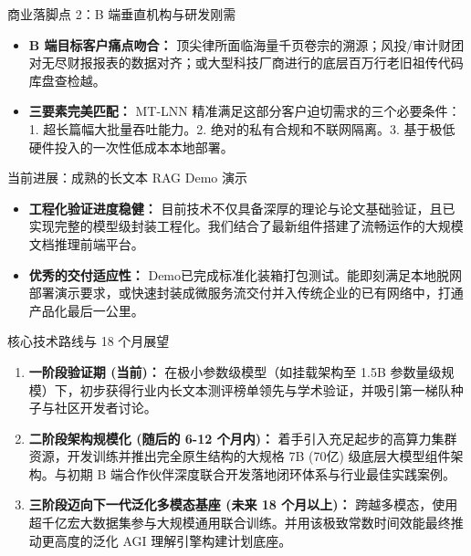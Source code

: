 ﻿\documentclass[aspectratio=169, 10pt]{beamer}
\begin{document}
\begin{frame}{商业落脚点 2：B 端垂直机构与研发刚需}
\begin{itemize}
    \item \textbf{B 端目标客户痛点吻合：} 
        顶尖律所面临海量千页卷宗的溯源；风投/审计财团对无尽财报报表的数据对齐；或大型科技厂商进行的底层百万行老旧祖传代码库盘查检越。
    \item \textbf{三要素完美匹配：} MT-LNN 精准满足这部分客户迫切需求的三个必要条件：1. 超长篇幅大批量吞吐能力。2. 绝对的私有合规和不联网隔离。3. 基于极低硬件投入的一次性低成本本地部署。
\end{itemize}
\end{frame}

\begin{frame}{当前进展：成熟的长文本 RAG Demo 演示}
\begin{itemize}
    \item \textbf{工程化验证进度稳健：} 目前技术不仅具备深厚的理论与论文基础验证，且已实现完整的模型级封装工程化。我们结合了最新组件搭建了流畅运作的大规模文档推理前端平台。
    \item \textbf{优秀的交付适应性：} Demo已完成标准化装箱打包测试。能即刻满足本地脱网部署演示要求，或快速封装成微服务流交付并入传统企业的已有网络中，打通产品化最后一公里。
\end{itemize}
\end{frame}

\begin{frame}{核心技术路线与 18 个月展望}
\begin{enumerate}
    \item \textbf{一阶段验证期 (当前)：} 在极小参数级模型（如挂载架构至 1.5B 参数量级规模）下，初步获得行业内长文本测评榜单领先与学术验证，并吸引第一梯队种子与社区开发者讨论。
    \vspace{0.5em}
    \item \textbf{二阶段架构规模化 (随后的 6-12 个月内)：} 着手引入充足起步的高算力集群资源，开发训练并推出完全原生结构的大规格 7B (70亿) 级底层大模型组件架构。与初期 B 端合作伙伴深度联合开发落地闭环体系与行业最佳实践案例。
    \vspace{0.5em}
    \item \textbf{三阶段迈向下一代泛化多模态基座 (未来 18 个月以上)：} 跨越多模态，使用超千亿宏大数据集参与大规模通用联合训练。并用该极致常数时间效能最终推动更高度的泛化 AGI 理解引擎构建计划底座。
\end{enumerate}
\end{frame}
\end{document}
